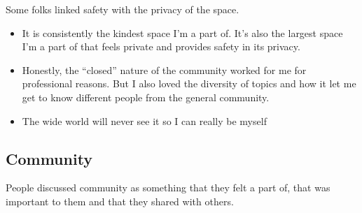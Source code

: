 \documentclass[
]{book}
\providecommand{\tightlist}{%
  \setlength{\itemsep}{0pt}\setlength{\parskip}{0pt}}
\begin{document}
Some folks linked safety with the privacy of the space.

\begin{itemize}
\tightlist
\item
  It is consistently the kindest space I'm a part of. It's also the largest space I'm a part of that feels private and provides safety in its privacy.
\item
  Honestly, the ``closed'' nature of the community worked for me for professional reasons. But I also loved the diversity of topics and how it let me get to know different people from the general community.
\item
  The wide world will never see it so I can really be myself
\end{itemize}

\subsection{Community}\label{community-1}

People discussed community as something that they felt a part of, that was important to them and that they shared with others.
\end{document}
